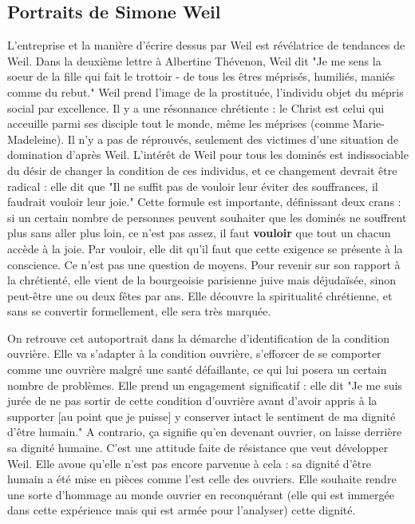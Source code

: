 \documentclass[a4paper,12pt]{book}
\begin{document}
\subsection{Portraits de Simone Weil}
L'entreprise et la manière d'écrire dessus par Weil est révélatrice de tendances de Weil. Dans la deuxième lettre à Albertine Thévenon, Weil dit "Je me sens la soeur de la fille qui fait le trottoir - de tous les êtres méprisés, humiliés, maniés comme du rebut." Weil prend l'image de la prostituée, l'individu objet du mépris social par excellence. Il y a une résonnance chrétiente : le Christ est celui qui acceuille parmi ses disciple tout le monde, même les méprises (comme Marie-Madeleine). Il n'y a pas de réprouvés, seulement des victimes d'une situation de domination d'après Weil. L'intérêt de Weil pour tous les dominés est indissociable du désir de changer la condition de ces individus, et ce changement devrait être radical : elle dit que "Il ne suffit pas de vouloir leur éviter des souffrances, il faudrait vouloir leur joie." Cette formule est importante, définissant deux crans : si un certain nombre de personnes peuvent souhaiter que les dominés ne souffrent plus sans aller plus loin, ce n'est pas assez, il faut \textbf{vouloir} que tout un chacun accède à la joie. Par vouloir, elle dit qu'il faut que cette exigence se présente à la conscience. Ce n'est pas une question de moyens. Pour revenir sur son rapport à la chrétienté, elle vient de la bourgeoisie parisienne juive mais déjudaïsée, sinon peut-être une ou deux fêtes par ans. Elle découvre la spiritualité chrétienne, et sans se convertir formellement, elle sera très marquée.
\par On retrouve cet autoportrait dans la démarche d'identification de la condition ouvrière. Elle va s'adapter à la condition ouvrière, s'efforcer de se comporter comme une ouvrière malgré une santé défaillante, ce qui lui posera un certain nombre de problèmes. Elle prend un engagement significatif : elle dit "Je me suis jurée de ne pas sortir de cette condition d'ouvrière avant d'avoir appris à la supporter [au point que je puisse] y conserver intact le sentiment de ma dignité d'être humain." A contrario, ça signifie qu'en devenant ouvrier, on laisse derrière sa dignité humaine. C'est une attitude faite de résistance que veut développer Weil. Elle avoue qu'elle n'est pas encore parvenue à cela : sa dignité d'être humain a été mise en pièces comme l'est celle des ouvriers. Elle souhaite rendre une sorte d'hommage au monde ouvrier en reconquérant (elle qui est immergée dans cette expérience mais qui est armée pour l'analyser) cette dignité.
\end{document}
